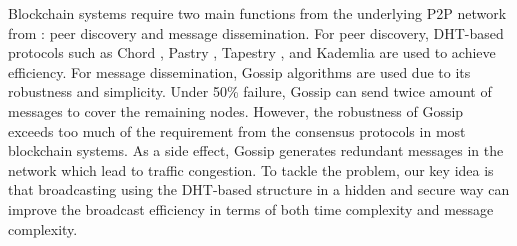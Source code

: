 
Blockchain systems require two main functions from the underlying P2P network from : peer discovery and message dissemination. For peer discovery, DHT-based protocols such as Chord \cite{stoica2001chord}, Pastry \cite{rowstron2001pastry}, Tapestry \cite{zhao2004tapestry}, and Kademlia \cite{maymounkov2002kademlia} are used to achieve efficiency. For message dissemination, Gossip algorithms are used due to its robustness and simplicity. Under 50\% failure, Gossip can send twice amount of messages to cover the remaining nodes. However, the robustness of Gossip exceeds too much of the requirement from the consensus protocols in most blockchain systems. As a side effect, Gossip generates redundant messages in the network which lead to traffic congestion. To tackle the problem, our key idea is that broadcasting using the DHT-based structure in a hidden and secure way can improve the broadcast efficiency in terms of both time complexity and message complexity.

